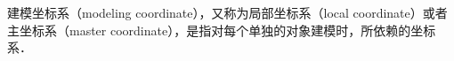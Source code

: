 
建模坐标系（modeling coordinate），又称为局部坐标系（local coordinate）或者主坐标系（master coordinate），是指对每个单独的对象建模时，所依赖的坐标系．